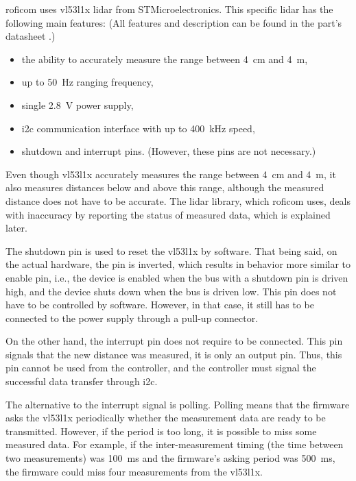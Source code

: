 \documentclass[
  digital,     %
  oneside,     %
  nosansbold,  %
  nocolorbold, %
  nolof,         %
  nolot,         %
]{fithesis4}
\begin{document}
{{{\acrshort{roficom} uses \gls{vl53l1x} \acrshort{lidar} from STMicroelectronics. This specific \acrshort{lidar} has the following main features: (All features and description can be found in the part's datasheet \cite{vl53l1x}.)

\begin{itemize}
    \item the ability to accurately measure the range between \qty{4}{\centi\metre} and \qty{4}{\metre},
    \item up to \qty{50}{\hertz} ranging frequency,
    \item single \qty{2.8}{\volt} power supply,
    \item \acrshort{i2c} communication interface with up to \qty{400}{\kilo\hertz} speed,
    \item shutdown and interrupt pins. (However, these pins are not necessary.)
\end{itemize}

Even though \gls{vl53l1x} accurately measures the range between \qty{4}{\centi\metre} and \qty{4}{\metre}, it also measures distances below and above this range, although the measured distance does not have to be accurate. The lidar library, which \acrshort{roficom} uses, deals with inaccuracy by reporting the status of measured data, which is explained later.

The shutdown pin is used to reset the \gls{vl53l1x} by software. That being said, on the actual hardware, the pin is inverted, which results in behavior more similar to enable pin, i.e., the device is enabled when the bus with a shutdown pin is driven high, and the device shuts down when the bus is driven low. This pin does not have to be controlled by software. However, in that case, it still has to be connected to the power supply through a pull-up connector.

On the other hand, the interrupt pin does not require to be connected. This pin signals that the new distance was measured, it is only an output pin. Thus, this pin cannot be used from the controller, and the controller must signal the successful data transfer through \acrshort{i2c}.

The alternative to the interrupt signal is polling. Polling means that the firmware asks the \gls{vl53l1x} periodically whether the measurement data are ready to be transmitted. However, if the period is too long, it is possible to miss some measured data. For example, if the inter-measurement timing (the time between two measurements) was \qty{100}{\milli\second} and the firmware's asking period was \qty{500}{\milli\second}, the firmware could miss four measurements from the \gls{vl53l1x}.

}}}
\end{document}
